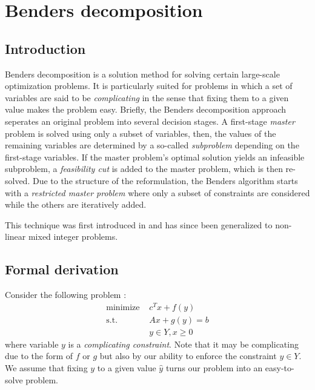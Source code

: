 \chapter{Benders decomposition}
\label{chap:benders}

\section{Introduction}

Benders decomposition is a solution method for solving certain large-scale optimization problems. It is particularly suited for problems in which a set of variables are said to be \textit{complicating} in the sense that fixing them to a given value makes the problem easy. Briefly, the Benders decomposition approach seperates an original problem into several decision stages. A first-stage \textit{master} problem is solved using only a subset of variables, then, the values of the remaining variables are determined by a so-called \textit{subproblem} depending on the first-stage variables. If the master problem's optimal solution yields an infeasible subproblem, a \textit{feasibility cut} is added to the master problem, which is then re-solved. Due to the structure of the reformulation, the Benders algorithm starts with a \textit{restricted master problem} where only a subset of constraints are considered while the others are iteratively added. 

This technique was first introduced in \cite{Benders1962} and has since been generalized to non-linear mixed integer problems. 

\section{Formal derivation}

Consider the following problem :
\begin{align}
    \textrm{minimize } & c^Tx + f(y) \\
    \textrm{s.t. } & Ax + g(y) = b \\
    & y\in Y, x\ge 0
\end{align} where variable $y$ is a \textit{complicating constraint}. Note that it may be complicating due to the form of $f$ or $g$ but also by our ability to enforce the constraint $y\in Y$. We assume that fixing $y$ to a given value $\hat y$ turns our problem into an easy-to-solve problem. 

